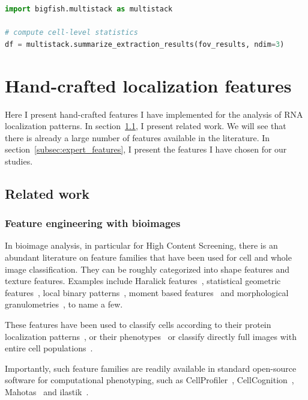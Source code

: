 \begin{minipage}{0.9\textwidth}
\begin{lstlisting}[language=Python]
import bigfish.multistack as multistack

# compute cell-level statistics
df = multistack.summarize_extraction_results(fov_results, ndim=3)
\end{lstlisting}
\end{minipage}

\section{Hand-crafted localization features}
\label{sec:hand_features}

Here I present hand-crafted features I have implemented for the analysis of \ac{RNA} localization patterns.
In section~\ref{subsec:related_work_hand_features}, I present related work.
We will see that there is already a large number of features available in the literature.
In section~\ref{subsec:expert_features}, I present the features I have chosen for our studies.

\subsection{Related work}
\label{subsec:related_work_hand_features}

\subsubsection{Feature engineering with bioimages}

In bioimage analysis, in particular for High Content Screening, there is an abundant literature on feature families that have been used for cell and whole image classification.
They can be roughly categorized into shape features and texture features.
Examples include Haralick features~\cite{Haralick1973}, statistical geometric features~\cite{Walker1996}, local binary patterns~\cite{ahonen_2006}, moment based features~\cite{Reeve1992} and morphological granulometries~\cite{Serra1983}, to name a few.

These features have been used to classify cells according to their protein localization patterns~\cite{boland_automated_1998, Glory2007}, or their phenotypes~\cite{Wang2008, Jones2009, Walter2010, Walter2020BioimageIF} or classify directly full images with entire cell populations~\cite{Uhlmann2016}.

Importantly, such feature families are readily available in standard open-source software for computational phenotyping, such as CellProfiler~\cite{Carpenter2006, Jones2008, mcquin_cellprofiler_2018}, CellCognition~\cite{held_cellcognition_2010}, Mahotas~\cite{mahotas_2013} and ilastik~\cite{berg_ilastik_2019}.

